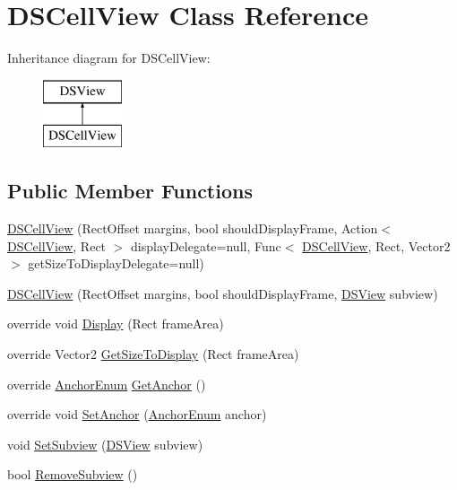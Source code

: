 \hypertarget{class_d_s_cell_view}{\section{D\+S\+Cell\+View Class Reference}
\label{class_d_s_cell_view}
}
Inheritance diagram for D\+S\+Cell\+View\+:\begin{figure}[H]
\begin{center}
\leavevmode
\includegraphics[height=2.000000cm]{class_d_s_cell_view}
\end{center}
\end{figure}
\subsection*{Public Member Functions}
\begin{DoxyCompactItemize}
\item 
\hyperlink{class_d_s_cell_view_a0b9203dbe784f056493965527e6756df}{D\+S\+Cell\+View} (Rect\+Offset margins, bool should\+Display\+Frame, Action$<$ \hyperlink{class_d_s_cell_view}{D\+S\+Cell\+View}, Rect $>$ display\+Delegate=null, Func$<$ \hyperlink{class_d_s_cell_view}{D\+S\+Cell\+View}, Rect, Vector2 $>$ get\+Size\+To\+Display\+Delegate=null)
\item 
\hyperlink{class_d_s_cell_view_aab6521a9fc5ba2d838e91506c004b8d9}{D\+S\+Cell\+View} (Rect\+Offset margins, bool should\+Display\+Frame, \hyperlink{class_d_s_view}{D\+S\+View} subview)
\item 
override void \hyperlink{class_d_s_cell_view_aa09bac134c2e63ba0588f7bc90cabf4d}{Display} (Rect frame\+Area)
\item 
override Vector2 \hyperlink{class_d_s_cell_view_a98955dbfcfceb95b17990a4978945739}{Get\+Size\+To\+Display} (Rect frame\+Area)
\item 
override \hyperlink{class_d_s_view_a8b41b9ec1b18bd33872a37cbd3a2dbe1}{Anchor\+Enum} \hyperlink{class_d_s_cell_view_acd9feb24b44a04fe321420ca42a60a30}{Get\+Anchor} ()
\item 
override void \hyperlink{class_d_s_cell_view_aae1d13aa6591f57d047496f22b406012}{Set\+Anchor} (\hyperlink{class_d_s_view_a8b41b9ec1b18bd33872a37cbd3a2dbe1}{Anchor\+Enum} anchor)
\item 
void \hyperlink{class_d_s_cell_view_aa627e7a9f81987df1f1b6594ae9c9d43}{Set\+Subview} (\hyperlink{class_d_s_view}{D\+S\+View} subview)
\item 
bool \hyperlink{class_d_s_cell_view_af30684354436f50cd99606198f28b18c}{Remove\+Subview} ()
\end{DoxyCompactItemize}
